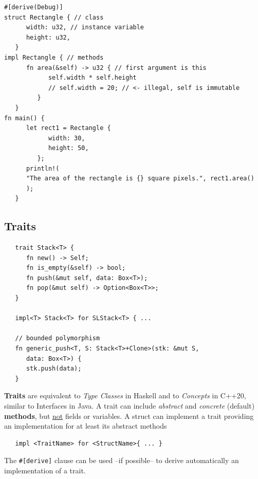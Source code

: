 \begin{lstlisting}
#[derive(Debug)]
struct Rectangle { // class
      width: u32, // instance variable
      height: u32,
   }
impl Rectangle { // methods
      fn area(&self) -> u32 { // first argument is this
            self.width * self.height
            // self.width = 20; // <- illegal, self is immutable
         }
   }
fn main() {
      let rect1 = Rectangle {
            width: 30,
            height: 50,
         };
      println!(
      "The area of the rectangle is {} square pixels.", rect1.area()
      );
   }
\end{lstlisting}

\subsection{Traits}

\begin{lstlisting}
   trait Stack<T> {
      fn new() -> Self;
      fn is_empty(&self) -> bool;
      fn push(&mut self, data: Box<T>);
      fn pop(&mut self) -> Option<Box<T>>;
   }

   impl<T> Stack<T> for SLStack<T> { ...

   // bounded polymorphism
   fn generic_push<T, S: Stack<T>+Clone>(stk: &mut S,
      data: Box<T>) {
      stk.push(data);
   }
\end{lstlisting}
\textbf{Traits} are equivalent to \textit{Type Classes} in Haskell and to \textit{Concepts} in
C++20, similar to Interfaces in Java.
A trait can include \textit{abstract} and \textit{concrete} (default)
\textbf{methods}, but \underline{not} fields or variables.
A struct can implement a trait providing an
implementation for at least its abstract methods
\begin{lstlisting}
   impl <TraitName> for <StructName>{ ... }
\end{lstlisting}

The \lstinline|#[derive]| clause can be used {--}if possible{--} to derive
automatically an implementation of a trait.
\nl

